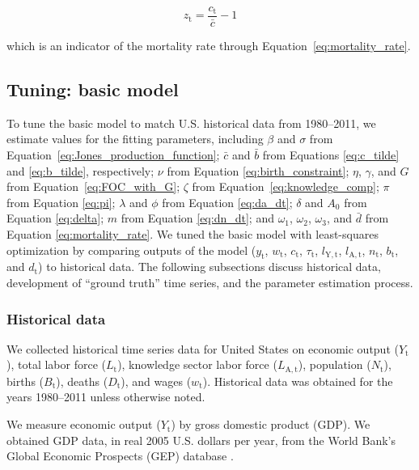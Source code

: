\documentclass[letterpaper,12pt]{article}
\begin{document}
\begin{equation} \label{eq:z}
	z_\mathrm{t} = \frac{c_\mathrm{t}}{\bar c} - 1
\end{equation}

\noindent which is an indicator of the mortality rate through Equation~\ref{eq:mortality_rate}.

\subsection{Tuning: basic model}
\label{sec:basic_model_tuning}

To tune the basic model to match U.S. historical data from 1980--2011, we estimate values for the fitting parameters, including $\beta$ and $\sigma$ from Equation~\ref{eq:Jones_production_function}; $\bar c$ and $\bar b$ from Equations \ref{eq:c_tilde} and \ref{eq:b_tilde}, respectively; $\nu$ from Equation \ref{eq:birth_constraint}; $\eta$, $\gamma$, and $G$ from Equation~\ref{eq:FOC_with_G}; $\zeta$ from Equation~\ref{eq:knowledge_comp}; $\pi$ from Equation \ref{eq:pi}; $\lambda$ and $\phi$ from Equation \ref{eq:da_dt}; $\delta$ and $A_\mathrm{0}$ from Equation \ref{eq:delta}; $m$ from Equation \ref{eq:dn_dt}; and $\omega_1$, $\omega_2$, $\omega_3$, and $\bar d$ from Equation \ref{eq:mortality_rate}. We tuned the basic model with least-squares optimization by comparing outputs of the model ($y_\mathrm{t}$, $w_\mathrm{t}$, $c_\mathrm{t}$, $\tau_\mathrm{t}$, $l_\mathrm{Y,t}$, $l_\mathrm{A,t}$, $n_\mathrm{t}$, $b_{\mathrm{t}}$, and $d_\mathrm{t}$) to historical data. The following subsections discuss historical data, development of ``ground truth'' time series, and the parameter estimation process.

\subsubsection{Historical data}
\label{sec:basic_model_historical_data}

We collected historical time series data for United States on economic output ($Y_\mathrm{t}$), total labor force ($L_\mathrm{t}$), knowledge sector labor force ($L_\mathrm{A,t}$), population ($N_\mathrm{t}$), births ($B_\mathrm{t}$), deaths ($D_\mathrm{t}$), and wages ($w_\mathrm{t}$). Historical data was obtained for the years 1980--2011 unless otherwise noted. 

We measure economic output ($Y_\mathrm{t}$) by gross domestic product (GDP). We obtained GDP data, in real 2005 U.S. dollars per year, from the World Bank's Global Economic Prospects (GEP) database \citep{WorldBankGEP:2013a}.
\end{document}
